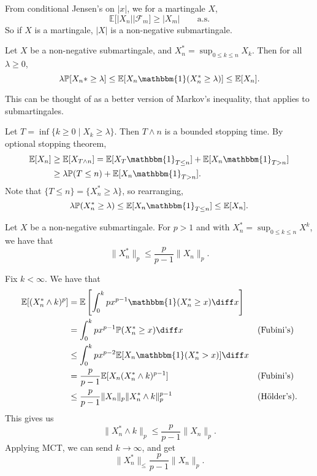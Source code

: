 \documentclass[12pt]{article}
\begin{document}

From conditional Jensen's on $|x|$, we for a martingale $X$,
\[
	\mathbb{E}[|X_n| | \mathcal{F}_m] \geq |X_m| \qquad \text{a.s.}
\]
So if $X$ is a martingale, $|X|$ is a non-negative submartingale.

\begin{theorem}
	Let $X$ be a non-negative submartingale, and $X_n^\ast = \sup_{0\leq k \leq n} X_k$. Then for all $\lambda \geq 0$,
	\[
		\lambda \mathbb{P}[X_n\ast \geq \lambda] \leq \mathbb{E}[X_n \mathbbm{1}(X_n^\ast \geq \lambda)] \leq \mathbb{E}[X_n].
	\]
\end{theorem}

This can be thought of as a better version of Markov's inequality, that applies to submartingales.

\begin{proofbox}
	Let $T = \inf\{k \geq 0 \mid X_k \geq \lambda\}$. Then $T \wedge n$ is a bounded stopping time. By optional stopping theorem,
	\begin{align*}
		\mathbb{E}[X_n] &\geq \mathbb{E}[X_{T \wedge n}] = \mathbb{E}[X_T \mathbbm{1}_{T \leq n}] + \mathbb{E}[X_n \mathbbm{1}_{T > n}] \\
				&\geq \lambda \mathbb{P}(T \leq n) + \mathbb{E}[X_n \mathbbm{1}_{T > n}].
	\end{align*}
	Note that $\{T \leq n\} = \{X_n^\ast \geq \lambda\}$, so rearranging,
	\[
	\lambda \mathbb{P}(X_n^\ast \geq \lambda) \leq \mathbb{E}[X_n \mathbbm{1}_{T \leq n}] \leq \mathbb{E}[X_n].
	\]
\end{proofbox}

\begin{theorem}
	Let $X$ be a non-negative submartingale. For $p > 1$ and with $X_n^\ast = \sup_{0 \leq k \leq n} X^k$, we have that
	\[
	\|X_n^\ast\|_p \leq \frac{p}{p-1} \|X_n\|_p.
	\]
\end{theorem}

\begin{proofbox}
	Fix $k < \infty$. We have that
	\begin{align*}
		\mathbb{E}[(X_n^\ast \wedge k)^p] &= \mathbb{E}\left[ \int_0^k p x^{p-1} \mathbbm{1}(X_n^\ast \geq x) \diff x \right] & & \\
						  &= \int_0^k px^{p-1} \mathbb{P}(X_n^\ast \geq x) \diff x & &\text{(Fubini's)} \\
						  &\leq \int_0^k p x^{p-2} \mathbb{E}[X_n \mathbbm{1}(X_n^\ast > x)] \diff x & & \\
						  &= \frac{p}{p-1} \mathbb{E}[X_n(X_n^\ast \wedge k)^{p-1}] & &\text{(Fubini's)} \\
						  &\leq \frac{p}{p-1} \|X_n\|_p \|X_n^\ast \wedge k\|_p^{p-1} & &\text{(H\"older's)}.
	\end{align*}
	This gives us
	\[
	\|X_n^\ast \wedge k\|_p \leq \frac{p}{p-1} \|X_n\|_p.
	\]
	Applying MCT, we can send $k \to \infty$, and get
	\[
	\|X_n^\ast\|_ \leq \frac{p}{p-1}\|X_n\|_p.
	\]
\end{proofbox}
\end{document}
